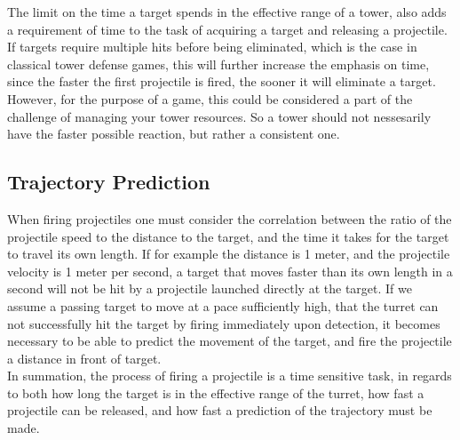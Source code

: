 The limit on the time a target spends in the effective range of a tower, also adds a requirement of time to the task of acquiring a target and releasing a projectile. If targets require multiple hits before being eliminated, which is the case in classical tower defense games, this will further increase the emphasis on time, since the faster the first projectile is fired, the sooner it will eliminate a target. However, for the purpose of a game, this could be considered a part of the challenge of managing your tower resources. So a tower should not nessesarily have the faster possible reaction, but rather a consistent one. 

\subsection{Trajectory Prediction}\label{sec:motionprediction}\label{\automlabel}
When firing projectiles one must consider the correlation between the ratio of the projectile speed to the distance to the target, and the time it takes for the target to travel its own length. If for example the distance is 1 meter, and the projectile velocity is 1 meter per second, a target that moves faster than its own length in a second will not be hit by a projectile launched directly at the target. If we assume a passing target to move at a pace sufficiently high, that the turret can not successfully hit the target by firing immediately upon detection, it becomes necessary to be able to predict the movement of the target, and fire the projectile a distance in front of target.\\

In summation, the process of firing a projectile is a time sensitive task, in regards to both how long the target is in the effective range of the turret, how fast a projectile can be released, and how fast a prediction of the trajectory must be made.







